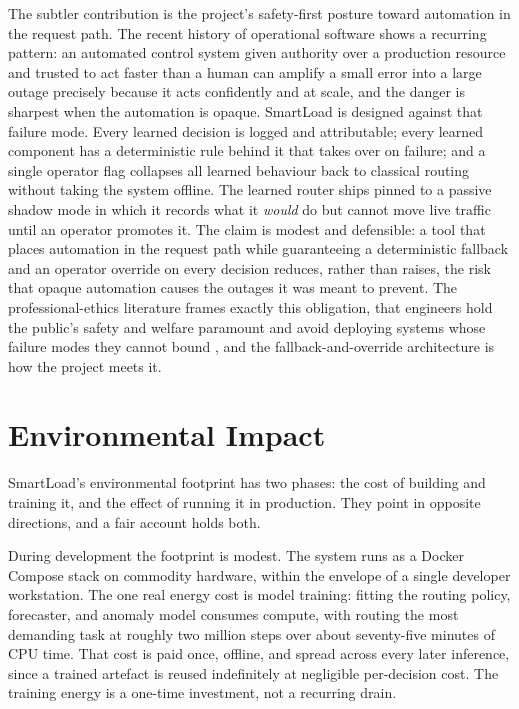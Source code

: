 The subtler contribution is the project's safety-first posture toward automation in the
request path. The recent history of operational software shows a recurring pattern: an
automated control system given authority over a production resource and trusted to act
faster than a human can amplify a small error into a large outage precisely because it
acts confidently and at scale, and the danger is sharpest when the automation is opaque.
SmartLoad is designed against that failure mode. Every learned decision is logged and
attributable; every learned component has a deterministic rule behind it that takes over
on failure; and a single operator flag collapses all learned behaviour back to classical
routing without taking the system offline. The learned router ships pinned to a passive
shadow mode in which it records what it \emph{would} do but cannot move live traffic
until an operator promotes it. The claim is modest and defensible: a tool that places
automation in the request path while guaranteeing a deterministic fallback and an
operator override on every decision reduces, rather than raises, the risk that opaque
automation causes the outages it was meant to prevent. The professional-ethics
literature frames exactly this obligation, that engineers hold the public's safety and
welfare paramount and avoid deploying systems whose failure modes they cannot bound
\cite{acm2018ethics, gotterbarn1999ethics}, and the fallback-and-override architecture
is how the project meets it.

\section{Environmental Impact}
\label{disc:environmental}

SmartLoad's environmental footprint has two phases: the cost of building and training
it, and the effect of running it in production. They point in opposite directions, and
a fair account holds both.

During development the footprint is modest. The system runs as a Docker Compose stack
on commodity hardware, within the envelope of a single developer workstation. The one
real energy cost is model training: fitting the routing policy, forecaster, and anomaly
model consumes compute, with routing the most demanding task at roughly two million
steps over about seventy-five minutes of CPU time. That cost is paid once, offline, and
spread across every later inference, since a trained artefact is reused indefinitely at
negligible per-decision cost. The training energy is a one-time investment, not a
recurring drain.

